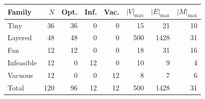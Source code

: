 \begin{tabular}{lrrrrrrr}
\toprule
Family & $N$ & Opt. & Inf. & Vac. & $|V|_{\max}$ & $|E|_{\max}$ & $|M|_{\max}$\\
\midrule
Tiny & 36 & 36 & 0 & 0 & 15 & 21 & 10\\
Layered & 48 & 48 & 0 & 0 & 500 & 1428 & 31\\
Fan & 12 & 12 & 0 & 0 & 18 & 31 & 16\\
Infeasible & 12 & 0 & 12 & 0 & 10 & 9 & 4\\
Vacuous & 12 & 0 & 0 & 12 & 8 & 7 & 6\\
\midrule
Total & 120 & 96 & 12 & 12 & 500 & 1428 & 31\\
\bottomrule
\end{tabular}
